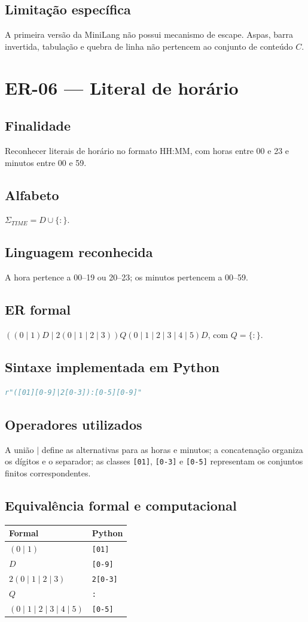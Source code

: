 \subsection{Limitação específica}
A primeira versão da MiniLang não possui mecanismo de escape. Aspas, barra invertida, tabulação e quebra de linha não pertencem ao conjunto de conteúdo \(C\).

\section{ER-06 --- Literal de horário}
\subsection{Finalidade}
Reconhecer literais de horário no formato HH:MM, com horas entre 00 e 23 e minutos entre 00 e 59.
\subsection{Alfabeto}
$\Sigma_{TIME}=D\cup\{:\}$.
\subsection{Linguagem reconhecida}
A hora pertence a 00--19 ou 20--23; os minutos pertencem a 00--59.
\subsection{ER formal}
$((0\mid1)D\mid2(0\mid1\mid2\mid3))Q(0\mid1\mid2\mid3\mid4\mid5)D$, com $Q=\{:\}$.
\subsection{Sintaxe implementada em Python}
\begin{lstlisting}[language=Python]
r"([01][0-9]|2[0-3]):[0-5][0-9]"
\end{lstlisting}
\subsection{Operadores utilizados}
A união $\mid$ define as alternativas para as horas e minutos; a concatenação organiza os dígitos e o separador; as classes \texttt{[01]}, \texttt{[0-3]} e \texttt{[0-5]} representam os conjuntos finitos correspondentes.
\subsection{Equivalência formal e computacional}
\begin{center}
\small
\begin{tabular}{|p{}|p{}|}
\toprule
Formal & Python \\
\midrule
$(0\mid1)$ & \texttt{[01]} \\
$D$ & \texttt{[0-9]} \\
$2(0\mid1\mid2\mid3)$ & \texttt{2[0-3]} \\
$Q$ & \texttt{:} \\
$(0\mid1\mid2\mid3\mid4\mid5)$ & \texttt{[0-5]} \\
\bottomrule
\end{tabular}
\end{center}
